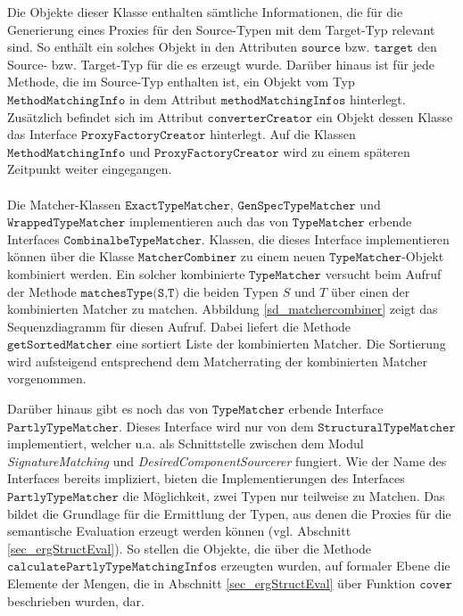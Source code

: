 \begin{figure}
\end{figure}\label{cd_modmi}
\noindent
Die Objekte dieser Klasse enthalten sämtliche Informationen, die für die Generierung eines Proxies für den Source-Typen mit dem Target-Typ relevant sind. So enthält ein solches Objekt in den Attributen $\texttt{source}$ bzw. $\texttt{target}$ den Source- bzw. Target-Typ für die es erzeugt wurde. Darüber hinaus ist für jede Methode, die im Source-Typ enthalten ist, ein Objekt vom Typ $\texttt{MethodMatchingInfo}$ in dem Attribut $\texttt{methodMatchingInfos}$ hinterlegt. Zusätzlich befindet sich im Attribut $\texttt{converterCreator}$ ein Objekt dessen Klasse das Interface $\texttt{ProxyFactoryCreator}$ hinterlegt. Auf die Klassen $\texttt{MethodMatchingInfo}$ und $\texttt{ProxyFactoryCreator}$ wird zu einem späteren Zeitpunkt weiter eingegangen.
\\\\
Die Matcher-Klassen $\texttt{ExactTypeMatcher}$, $\texttt{GenSpecTypeMatcher}$ und $\texttt{WrappedTypeMatcher}$ implementieren auch das von $\texttt{TypeMatcher}$ erbende Interfaces $\texttt{CombinalbeTypeMatcher}$. Klassen, die dieses Interface implementieren können über die Klasse $\texttt{MatcherCombiner}$ zu einem neuen $\texttt{TypeMatcher}$-Objekt kombiniert werden. Ein solcher kombinierte $\texttt{TypeMatcher}$ versucht beim Aufruf der Methode $\texttt{matchesType(S,T)}$ die beiden Typen $S$ und $T$ über einen der kombinierten Matcher zu matchen. Abbildung \ref{sd_matchercombiner} zeigt das Sequenzdiagramm für diesen Aufruf. Dabei liefert die Methode $\texttt{getSortedMatcher}$ eine sortiert Liste der kombinierten Matcher. Die Sortierung wird aufsteigend entsprechend dem Matcherrating der kombinierten Matcher vorgenommen.
\begin{figure}
\end{figure}\label{sd_matchercombiner}
\noindent
Darüber hinaus gibt es noch das von $\texttt{TypeMatcher}$ erbende Interface $\texttt{PartlyTypeMatcher}$. Dieses Interface wird nur von dem $\texttt{StructuralTypeMatcher}$ implementiert, welcher u.a. als Schnittstelle zwischen dem Modul \emph{SignatureMatching} und \emph{DesiredComponentSourcerer} fungiert. Wie der Name des Interfaces bereits impliziert, bieten die Implementierungen des Interfaces $\texttt{PartlyTypeMatcher}$ die Möglichkeit, zwei Typen nur teilweise zu Matchen. Das bildet die Grundlage für die Ermittlung der Typen, aus denen die Proxies für die semantische Evaluation erzeugt werden können (vgl. Abschnitt \ref{sec_ergStructEval}). So stellen die Objekte, die über die Methode $\texttt{calculatePartlyTypeMatchingInfos}$ erzeugten wurden, auf formaler Ebene die Elemente der Mengen, die in Abschnitt \ref{sec_ergStructEval} über Funktion $\texttt{cover}$ beschrieben wurden, dar.
